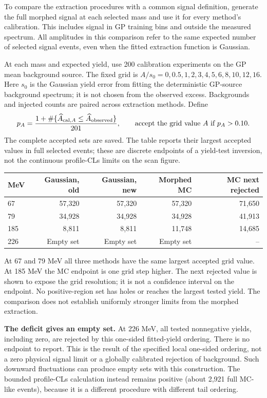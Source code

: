 \documentclass[11pt]{article}
\begin{document}
To compare the extraction procedures with a common signal definition, generate the full morphed signal at each selected mass and use it for every method's calibration. This includes signal in GP training bins and outside the measured spectrum. All amplitudes in this comparison refer to the same expected number of selected signal events, even when the fitted extraction function is Gaussian.

At each mass and expected yield, use 200 calibration experiments on the GP mean background source. The fixed grid is $A/s_0=0,0.5,1,2,3,4,5,6,8,10,12,16$. Here $s_0$ is the Gaussian yield error from fitting the deterministic GP-source background spectrum; it is not chosen from the observed excess. Backgrounds and injected counts are paired across extraction methods. Define
\[
 p_A=\frac{1+\#\{\widehat A_{{\rm cal},A}\le\widehat A_{\rm observed}\}}{201},
 \qquad \hbox{accept the grid value }A\hbox{ if }p_A>0.10.
\]
The complete accepted sets are saved. The table reports their largest accepted values in full selected events; these are discrete endpoints of a yield-test inversion, not the continuous profile-CLs limits on the scan figure.
\begin{center}\small\begin{tabular}{lrrrr}\toprule
MeV & Gaussian, old & Gaussian, new & Morphed MC & MC next rejected\\\midrule
67 & 57,320 & 57,320 & 57,320 & 71,650\\
79 & 34,928 & 34,928 & 34,928 & 41,913\\
185 & 8,811 & 8,811 & 11,748 & 14,685\\
226 & Empty set & Empty set & Empty set & --\\
\bottomrule\end{tabular}\end{center}
At 67 and 79 MeV all three methods have the same largest accepted grid value. At 185 MeV the MC endpoint is one grid step higher. The next rejected value is shown to expose the grid resolution; it is not a confidence interval on the endpoint. No positive-region set has holes or reaches the largest tested yield. The comparison does not establish uniformly stronger limits from the morphed extraction.

\textbf{The deficit gives an empty set.} At 226 MeV, all tested nonnegative yields, including zero, are rejected by this one-sided fitted-yield ordering. There is no endpoint to report. This is the result of the specified local one-sided ordering, not a zero physical signal limit or a globally calibrated rejection of background. Such downward fluctuations can produce empty sets with this construction. The bounded profile-CLs calculation instead remains positive (about 2,921 full MC-like events), because it is a different procedure with different tail ordering.
\end{document}
